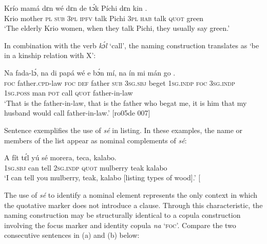 \ea%
    \label{ex:key:1376}
    \gll Krío  mamá  dɛn  wé  dɛn  de  tɔ́k  Píchi  dɛn  kin        .\\
Krio  mother  \textsc{pl}  \textsc{sub}  \textsc{3pl}  \textsc{ipfv}  talk  Pichi  \textsc{3pl}  \textsc{hab}  talk \textsc{quot}    green\\

\glt ‘The elderly Krio women, when they talk Pichi, they usually say green.’ 


\z

In combination with the verb \textit{kɔ́l} ‘call’, the naming construction translates as ‘be in a kinship relation with X’:


\ea%
    \label{ex:key:1377}
    \gll Na  fada-lɔ́,      na  di  papá  wé  e    bɔ́n    mí,    na  ín  
mi    mán    go        .\\
\textsc{foc}  father.\textsc{cpd}{}-law  \textsc{foc}  \textsc{def}  father  \textsc{sub}  \textsc{3sg.sbj}  beget  \textsc{1sg.indp}  \textsc{foc}  \textsc{3sg.indp}  
\textsc{1sg.poss}  man    \textsc{pot}  call  \textsc{quot}    father-in-law\\

\glt ‘That is the father-in-law, that is the father who begat me, it is him that my 
husband would call father-in-law.’ [ro05de 007]
\z

Sentence  exemplifies the use of \textit{sé} in listing. In these examples, the name or members of the list appear as nominal complements of \textit{sé}: 


\ea%
    \label{ex:key:1378}
    \gll A    fít  tɛ́l  yú    sé    morera,    teca,  kalabo.\\
\textsc{1sg.sbj}  can  tell  \textsc{2sg.indp}  \textsc{quot}    mulberry  teak    kalabo\\

\glt ‘I can tell you mulberry, teak, kalabo [listing types of wood].’ [\textstylePichiexamplenumberZchnZchn{ro05de 051]}
\z

The use of \textit{sé} to identify a nominal element represents the only context in which the quotative marker does not introduce a clause. Through this characteristic, the naming construction may be structurally identical to a copula construction involving the focus marker and identity copula \textit{na} ‘\textsc{foc}’. Compare the two consecutive sentences in (a) and (b) below: 


